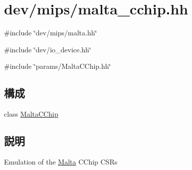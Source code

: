 \hypertarget{malta__cchip_8hh}{
\section{dev/mips/malta\_\-cchip.hh}
\label{malta__cchip_8hh}
}
{\ttfamily \#include \char`\"{}dev/mips/malta.hh\char`\"{}}\par
{\ttfamily \#include \char`\"{}dev/io\_\-device.hh\char`\"{}}\par
{\ttfamily \#include \char`\"{}params/MaltaCChip.hh\char`\"{}}\par
\subsection*{構成}
\begin{DoxyCompactItemize}
\item 
class \hyperlink{classMaltaCChip}{MaltaCChip}
\end{DoxyCompactItemize}


\subsection{説明}
Emulation of the \hyperlink{classMalta}{Malta} CChip CSRs 